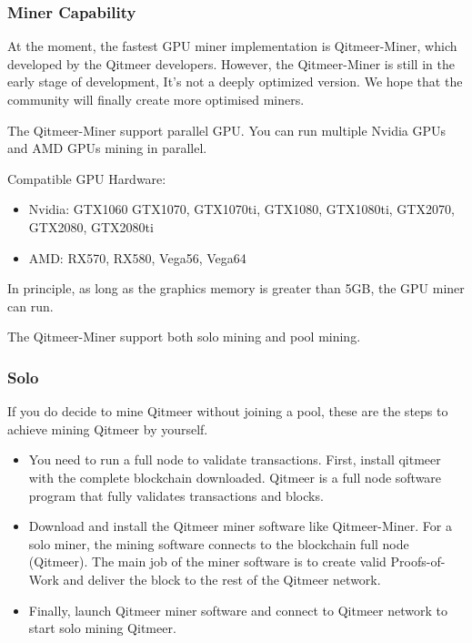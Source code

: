 \documentclass[a4paper,11pt]{article}
\begin{document}
\subsubsection{Miner Capability}

At the moment, the fastest GPU miner implementation is Qitmeer-Miner, which developed by the Qitmeer developers. 
However, the Qitmeer-Miner is still in the early stage of development, It's not a deeply optimized version. We hope 
that the community will finally create more optimised miners.

The Qitmeer-Miner support parallel GPU. You can run multiple Nvidia GPUs and AMD GPUs mining in parallel.

Compatible GPU Hardware:

\begin{itemize}
\item Nvidia: GTX1060 GTX1070, GTX1070ti, GTX1080, GTX1080ti, GTX2070, GTX2080, GTX2080ti
\item AMD: RX570, RX580, Vega56, Vega64
\end{itemize}

In principle, as long as the graphics memory is greater than 5GB, the GPU miner can run.

The Qitmeer-Miner support both solo mining and pool mining. 

\subsubsection*{Solo}
If you do decide to mine Qitmeer without joining a pool, these are the steps to achieve mining Qitmeer by yourself.

\begin{itemize}
\item You need to run a full node to validate transactions. First, install qitmeer\cite{qitmeer} with the complete blockchain downloaded. Qitmeer is a full node software program that fully validates transactions and blocks. 
\item Download and install the Qitmeer miner software like Qitmeer-Miner. For a solo miner, the mining software connects to the blockchain full node (Qitmeer). The main job of the miner software is to create valid Proofs-of-Work and deliver the block to the rest of the Qitmeer network.
\item Finally, launch Qitmeer miner software and connect to Qitmeer network to start solo mining Qitmeer.
\end{itemize}
\end{document}
